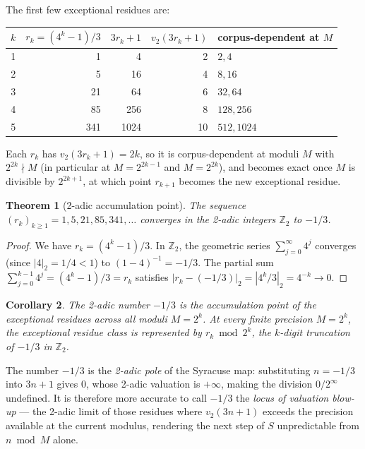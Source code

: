 \documentclass[12pt,a4paper]{article}
\newtheorem{theorem}{Theorem}
\newtheorem{corollary}[theorem]{Corollary}
\newcommand{\Ztwo}{\mathbb{Z}_2}
\begin{document}
The first few exceptional residues are:

\begin{center}
\begin{tabular}{rrrrl}
\toprule
$k$ & $r_k = (4^k-1)/3$ & $3r_k+1$ & $v_2(3r_k+1)$ & corpus-dependent at $M$ \\
\midrule
1 & 1   & 4   & 2 & $2, 4$         \\
2 & 5   & 16  & 4 & $8, 16$        \\
3 & 21  & 64  & 6 & $32, 64$       \\
4 & 85  & 256 & 8 & $128, 256$     \\
5 & 341 & 1024 & 10 & $512, 1024$ \\
\bottomrule
\end{tabular}
\end{center}

Each $r_k$ has $v_2(3r_k+1) = 2k$, so it is corpus-dependent at moduli $M$
with $2^{2k} \nmid M$ (in particular at $M = 2^{2k-1}$ and $M = 2^{2k}$),
and becomes exact once $M$ is divisible by $2^{2k+1}$, at which point
$r_{k+1}$ becomes the new exceptional residue.

\begin{theorem}[2-adic accumulation point]
\label{thm:attractor}
The sequence $(r_k)_{k \geq 1} = 1, 5, 21, 85, 341, \ldots$ converges in the
2-adic integers $\Ztwo$ to $-1/3$.
\end{theorem}

\begin{proof}
We have $r_k = (4^k - 1)/3$.  In $\Ztwo$, the geometric series
$\sum_{j=0}^{\infty} 4^j$ converges (since $|4|_2 = 1/4 < 1$) to
$(1 - 4)^{-1} = -1/3$.  The partial sum $\sum_{j=0}^{k-1} 4^j = (4^k-1)/3 =
r_k$ satisfies $|r_k - (-1/3)|_2 = |4^k/3|_2 = 4^{-k} \to 0$.
\end{proof}

\begin{corollary}
\label{cor:attractor}
The 2-adic number $-1/3$ is the accumulation point of the exceptional
residues across all moduli $M = 2^k$.  At every finite precision $M = 2^k$,
the exceptional residue class is represented by $r_k \bmod 2^k$, the $k$-digit
truncation of $-1/3$ in $\Ztwo$.
\end{corollary}

The number $-1/3$ is the \emph{2-adic pole} of the Syracuse map: substituting
$n = -1/3$ into $3n+1$ gives $0$, whose 2-adic valuation is $+\infty$, making
the division $0/2^\infty$ undefined.  It is therefore more accurate to call
$-1/3$ the \emph{locus of valuation blow-up} — the 2-adic limit of those
residues where $v_2(3n+1)$ exceeds the precision available at the current
modulus, rendering the next step of $S$ unpredictable from $n \bmod M$ alone.
\end{document}
